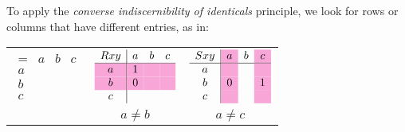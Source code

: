 \documentclass[PHIL101-Textbook.tex]{subfiles}
\begin{document}
%

To apply the \emph{converse indiscernibility of identicals} principle, we look for rows or columns that have different entries, as in:

\begin{center}
  \begin{tabular}{ccc}
    $\begin{array}{c|ccc}
	   = & a & b & c\\ \hline
	   a &   &   & \\
	   b &   &   & \\
	   c &   &   & 
	\end{array}$
	&
   $\begin{array}{c|ccc}
	  \atom R {xy} & a & b & c\\ \hline
	  \cellcolor{magenta!35} a & \cellcolor{magenta!35} \vT &\cellcolor{magenta!35}&\cellcolor{magenta!35} \\
	  \cellcolor{magenta!35} b & \cellcolor{magenta!35} \vF& \cellcolor{magenta!35}&\cellcolor{magenta!35} \\
 c & & \\
	\end{array}$
	&
  $\begin{array}{c|ccc}
	  \atom S {xy} & \cellcolor{magenta!35} a  & b & \cellcolor{magenta!35} c\\ \hline
	  a & \cellcolor{magenta!35} &  &\cellcolor{magenta!35} \\
	  b & \cellcolor{magenta!35}\vF&&\cellcolor{magenta!35}\vT\\
	  c & \cellcolor{magenta!35} &  &\cellcolor{magenta!35} 
	\end{array}$\\
 & $a\neq b$ & $a\neq c$
  \end{tabular}
\end{center}
\end{document}
